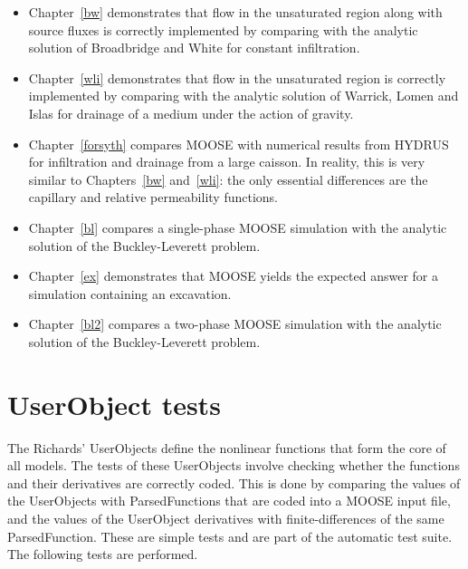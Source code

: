 \documentclass[]{scrreprt}
\begin{document}
\begin{itemize}
\item Chapter~\ref{bw} demonstrates that flow in the unsaturated
  region along with source fluxes is correctly implemented by comparing
  with the analytic solution of Broadbridge and White for constant
  infiltration.
\item Chapter~\ref{wli} demonstrates that flow in the unsaturated
  region is correctly implemented by comparing with the analytic
  solution of Warrick, Lomen and Islas for drainage of a medium under
  the action of gravity.
\item Chapter~\ref{forsyth} compares MOOSE with numerical results from
  HYDRUS for infiltration and drainage from a large caisson.  In
  reality, this is very similar to Chapters~\ref{bw} and~\ref{wli}:
  the only essential differences are the capillary and relative
  permeability functions.
\item Chapter~\ref{bl} compares a single-phase MOOSE simulation with
  the analytic solution of the Buckley-Leverett problem.
\item Chapter~\ref{ex} demonstrates that MOOSE yields the expected
  answer for a simulation containing an excavation.
\item Chapter~\ref{bl2} compares a two-phase MOOSE simulation with
  the analytic solution of the Buckley-Leverett problem.
\end{itemize}


\chapter{UserObject tests}
\label{uo}

The Richards' UserObjects define the nonlinear functions that form the
core of all models.  The tests of these UserObjects involve checking
whether the functions and their derivatives are correctly coded.  This
is done by comparing the values of the UserObjects with
ParsedFunctions that are coded into a MOOSE input file, and the values
of the UserObject derivatives with finite-differences of the same
ParsedFunction.  These are simple tests and are part of the automatic
test suite.  The following tests are performed.
\end{document}
